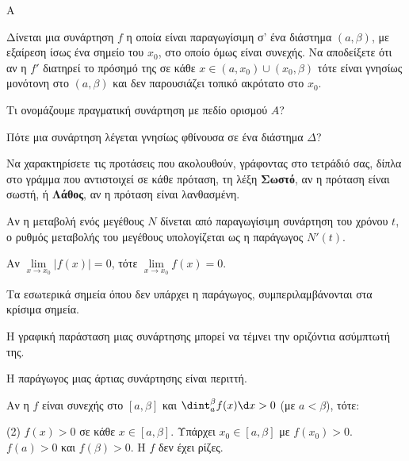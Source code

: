 \begin{thema}{A}
\begin{erwthma}
    \item Δίνεται μια συνάρτηση $ f $ η οποία είναι παραγωγίσιμη σ’ ένα διάστημα $ (a,\beta) $, με
εξαίρεση ίσως ένα σημείο του $ x_0 $, στο οποίο όμως είναι συνεχής. Να αποδείξετε ότι αν η $ f' $ διατηρεί το πρόσημό της σε κάθε $ x\in(a,x_0)\cup(x_0,\beta) $ τότε είναι γνησίως μονότονη στο $ (a,\beta) $ και δεν παρουσιάζει τοπικό ακρότατο στο $ x_0 $.
    \item Τι ονομάζουμε πραγματική συνάρτηση με πεδίο ορισμού $A$?
    \item Πότε μια συνάρτηση λέγεται γνησίως φθίνουσα σε ένα διάστημα $\Delta$?
    \item Να χαρακτηρίσετε τις προτάσεις που ακολουθούν, γράφοντας στο τετράδιό σας, δίπλα στο γράμμα που αντιστοιχεί σε κάθε πρόταση, τη λέξη \textbf{Σωστό}, αν η πρόταση είναι σωστή, ή \textbf{Λάθος}, αν η πρόταση είναι λανθασμένη.
    \begin{alist}
        \item Αν η μεταβολή ενός μεγέθους $N$ δίνεται από παραγωγίσιμη συνάρτηση του χρόνου $t$, ο ρυθμός μεταβολής του μεγέθους υπολογίζεται ως η παράγωγος $N'(t)$.
        \item Αν $\lim\limits_{x\to x_0} |f(x)| = 0$, τότε $\lim\limits_{x\to x_0} f(x) = 0$.
        \item Τα εσωτερικά σημεία όπου δεν υπάρχει η παράγωγος, συμπεριλαμβάνονται στα κρίσιμα σημεία.
        \item Η γραφική παράσταση μιας συνάρτησης μπορεί να τέμνει την οριζόντια ασύμπτωτή της.
        \item Η παράγωγος μιας άρτιας συνάρτησης είναι περιττή.
    \end{alist}
    \item Αν η $f$ είναι συνεχής στο $[a, \beta]$ και $\dint_a^\beta f(x)\d x > 0$ (με $a < \beta$), τότε:
    \begin{tasks}[label=\let\textdexiakeraia\relax\alph*.](2)
        \task $f(x) > 0$ σε κάθε $x \in [a, \beta]$.
        \task Υπάρχει $x_0 \in [a, \beta]$ με $f(x_0) > 0$.
        \task $f(a) > 0$ και $f(\beta) > 0$.
        \task H $f$ δεν έχει ρίζες.
    \end{tasks}
\end{erwthma}
\end{thema}


